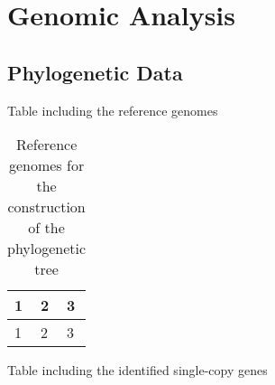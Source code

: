 
\section{Genomic Analysis} %
\label{sec:genomic_analysis}

	\subsection{Phylogenetic Data}
	
	Table including the reference genomes
	
	\begin{table}[htbp]
		\caption{Reference genomes for the construction of the phylogenetic tree}
		\label{tab:ref_genomes}
		\centering
		\begin{tabularx}{\textwidth}{XXX}
			\toprule
			\textbf{1} 			& \textbf{2}		& \textbf{3}		\\
			\midrule
			1	&	2	& 3 \\
			\bottomrule
		\end{tabularx}
	\end{table}

	Table including the identified single-copy genes
	
